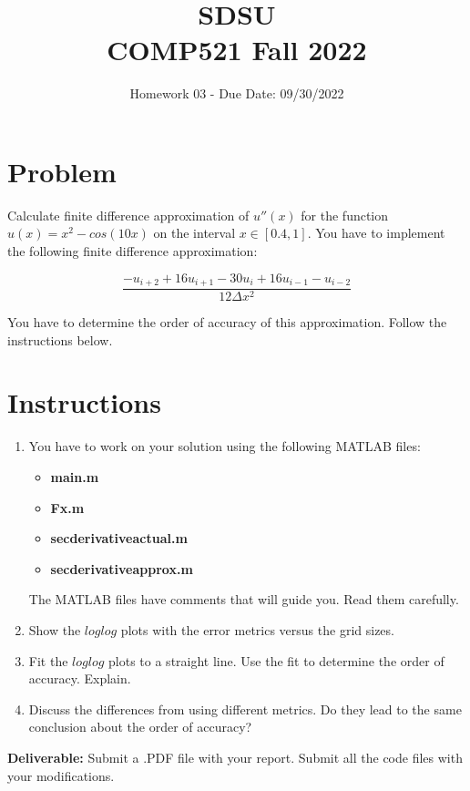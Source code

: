 \documentclass{article}
\title{SDSU \\ COMP521 Fall 2022}
\author{Homework 03 - Due Date: 09/30/2022}
\begin{document}
\maketitle

\section*{Problem}
Calculate finite difference approximation of $u''(x)$ for the function $u(x) = x^2 - cos(10x)$ on the interval $x \in [0.4,1]$. You have to implement the following finite difference approximation:

\begin{equation*}
	\frac{-u_{i+2} + 16u_{i+1}-30u_i+16u_{i-1} - u_{i-2}}{12\Delta x^2}
\end{equation*}

You have to determine the order of accuracy of this approximation. Follow the instructions below.\\

\section*{Instructions}
\begin{enumerate}
	\item You have to work on your solution using the following MATLAB files:
	\begin{itemize}
		\item \textbf{main.m }
		\item \textbf{Fx.m}
		\item \textbf{secderivativeactual.m}
		\item \textbf{secderivativeapprox.m}
	\end{itemize}
    The MATLAB files have comments that will guide you. Read them carefully.
	\item Show the $loglog$ plots with the error metrics versus the grid sizes.
	\item Fit the $loglog$ plots to a straight line. Use the fit to determine the order of accuracy. Explain.
	\item Discuss the differences from using different metrics. Do they lead to the same conclusion about the order of accuracy?
\end{enumerate}


\textbf{Deliverable:} Submit a .PDF file with your report. Submit all the code files with your modifications.
\end{document}
